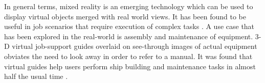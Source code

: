 In general terms, mixed reality is an emerging technology which can be used to display virtual objects merged with real world views. It has been found to be useful in job scenarios that require execution of complex tasks \parencite{henderson2011exploring}. A use case that has been explored in the real-world is assembly and maintenance of equipment. 3-D virtual job-support guides overlaid on see-through images of actual equipment obviates the need to look away in order to refer to a manual. It was found that virtual guides help users perform ship building and maintenance tasks in almost half the usual time \parencite{henderson2011exploring}. 


